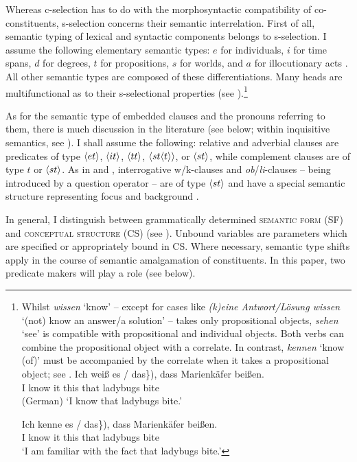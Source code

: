 \documentclass[output=paper,
colorlinks,
citecolor=brown,
newtxmath
]{langscibook}
\begin{document}
Whereas c-selection has to do with the morphosyntactic compatibility of co-constituents, s-selection concerns their semantic interrelation. First of all, semantic typing of lexical and syntactic components belongs to s-selection. I assume the following elementary semantic types: $e$ for individuals, $i$ for time spans, $d$ for degrees, $t$ for propositions, $s$ for worlds, and $a$ for illocutionary acts \citep[see][]{Krifka2004}. All other semantic types are composed of these differentiations. Many heads are multifunctional as to their s-selectional properties (see ).\footnote{Whilst \textit{wissen} `know' -- except for cases like \textit{(k)eine {Antwort/Lösung} wissen} `(not) know {an answer/a solution}' -- takes only propositional objects, \textit{sehen} `see' is compatible with propositional and individual objects. Both verbs can combine the propositional object with a correlate. In contrast, \textit{kennen} `know (of)' must be accompanied by the correlate when it takes a propositional object; see .
            \ea\label{ex:fn17}
                \ea \gll Ich weiß \minsp{(\{} es / das\}), dass Marienkäfer beißen.\\
                I know {} it {} this that ladybugs bite\\ \hfill (German)
                \glt `I know that ladybugs bite.'

                \ex \gll Ich kenne \minsp{*(\{} es / das\}), dass Marienkäfer beißen.\\
                I know {} it {} this that ladybugs bite\\
                \glt `I am familiar with the fact that ladybugs bite.'
            \z\z}

As for the semantic type of embedded clauses and the pronouns referring to them, there is much discussion in the literature (see below; within inquisitive semantics, see \citealt{Roelofsen2019,TheilerRoelofsenAloni2018}). I shall assume the following: relative and adverbial clauses are predicates of type $\langle{et}\rangle$, $\langle{it}\rangle$, $\langle{tt}\rangle$, ${\langle{st\ensuremath{\langle{t}\rangle}}\rangle}$, or $\langle{st}\rangle$, while complement clauses are of type $t$ or $\langle{st}\rangle$. As in \citet{BrandtReisRosengrenZimmermann1992} and \citet{Zimmermann1993,Zimmermann2009}, interrogative w/k-clauses and \textit{ob}/\textit{li}-clauses -- being introduced by a question operator -- are of type $\langle{st}\rangle$ and have a special semantic structure representing focus and background \citep[see][]{Krifka2001}.

In general, I distinguish between grammatically determined \textsc{semantic form} (SF) and \textsc{conceptual structure} (CS) (see \citealt{BierwischLang1987,Bierwisch2007,LangMaienborn2011}). Unbound variables are parameters which are specified or appropriately bound in CS. Where necessary, semantic type shifts apply in the course of semantic amalgamation of constituents. In this paper, two predicate makers will play a role (see below).
\end{document}
